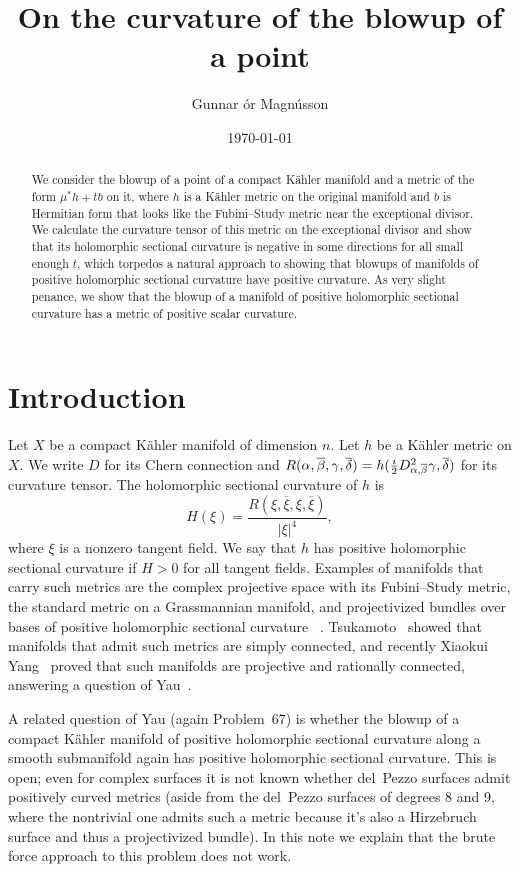 \documentclass[10pt,a4paper]{amsart}
\author{Gunnar \TH\'or Magn\'usson}
\date{\today}
\title{On the curvature of the blowup of a point}
\def\ov#1{\overline{#1}}
\def\hsc{holomorphic sectional curvature}
\begin{document}
\begin{abstract}
We consider the blowup of a point of a compact K\"ahler manifold and a metric
of the form $\mu^*h + t b$ on it, where $h$ is a K\"ahler metric on the
original manifold and $b$ is Hermitian form that looks like the
Fubini--Study metric near the exceptional divisor.
We calculate the curvature tensor of this metric on the exceptional divisor
and show that its holomorphic sectional curvature is negative in some
directions for all small enough $t$, which torpedos a natural approach to
showing that blowups of manifolds of positive holomorphic sectional curvature
have positive curvature. As very slight penance, we show that the blowup of a
manifold of positive \hsc{} has a metric of positive scalar curvature.
\end{abstract}

\maketitle


\section*{Introduction}

Let $X$ be a compact K\"ahler manifold of dimension $n$.
Let $h$ be a K\"ahler metric on $X$.
We write $D$ for its Chern connection and
$R(\alpha,\ov\beta,\gamma,\ov\delta) = h(\frac i2
D^2_{\smash{\alpha,\ov\beta}}\gamma, \ov\delta)$ for its curvature tensor. The
holomorphic sectional curvature of $h$ is
$$
H(\xi)
= \frac{R(\xi, \ov\xi, \xi, \ov\xi)}{|\xi|^4},
$$
where $\xi$ is a nonzero tangent field.
We say that $h$ has positive holomorphic sectional curvature if $H > 0$ for all
tangent fields.
Examples of manifolds that carry such metrics are the complex projective space
with its Fubini--Study metric, the standard metric on a Grassmannian manifold,
and projectivized bundles over bases of positive holomorphic sectional curvature
~\cite{alvarez2018projectivized}.
Tsukamoto~\cite{tsukamoto1957kahlerian} showed that manifolds that admit such
metrics are simply connected, and recently Xiaokui Yang~\cite{yang2017rc}
proved that such manifolds are projective and rationally connected, answering a
question of Yau~\cite[Problem~67]{yau1993open}.

A related question of Yau (again Problem~67) is whether the blowup of a compact
K\"ahler manifold of positive \hsc{} along a smooth submanifold again has
positive \hsc.
This is open; even for complex surfaces it is not known whether del~Pezzo
surfaces admit positively curved metrics (aside from the del~Pezzo surfaces of
degrees 8 and 9, where the nontrivial one admits such a metric because it's
also a Hirzebruch surface and thus a projectivized bundle). In this note we
explain that the brute force approach to this problem does not work.
\end{document}
